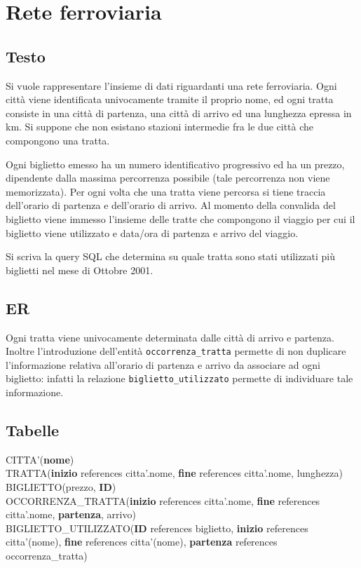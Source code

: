 \documentclass[11pt]{article}
\begin{document}
\newpage
\section{Rete ferroviaria}
\subsection{Testo}
Si vuole rappresentare l'insieme di dati riguardanti una rete ferroviaria. Ogni citt\`a
viene identificata univocamente tramite il proprio nome, ed ogni tratta consiste in una
citt\`a di partenza, una citt\`a di arrivo ed una lunghezza epressa in km. Si suppone che non
esistano stazioni intermedie fra le due citt\`a che compongono una tratta.

Ogni biglietto emesso ha un numero identificativo progressivo ed ha un prezzo, dipendente
dalla massima percorrenza possibile (tale percorrenza non viene memorizzata). Per ogni
volta che una tratta viene percorsa si tiene traccia dell'orario di partenza e dell'orario
di arrivo. Al momento
della convalida del biglietto viene immesso l'insieme delle tratte che compongono il
viaggio per cui il biglietto viene utilizzato e data/ora di partenza e arrivo del viaggio.

Si scriva la query SQL che determina su quale tratta sono stati utilizzati pi\`u biglietti
nel mese di Ottobre 2001.

\subsection{ER}
\begin{center}
\end{center}

Ogni tratta viene univocamente determinata dalle citt\`a di arrivo e partenza. Inoltre
l'introduzione dell'entit\`a \texttt{occorrenza\_tratta} permette di non duplicare
l'informazione relativa all'orario di partenza e arrivo da associare ad ogni biglietto:
infatti la relazione \texttt{biglietto\_utilizzato} permette di individuare tale
informazione.

\subsection{Tabelle}

\noindent
CITTA'(\textbf{nome})\\
TRATTA(\textbf{inizio} references citta'.nome, \textbf{fine} references citta'.nome,
lunghezza)\\
BIGLIETTO(prezzo, \textbf{ID})\\
OCCORRENZA\_TRATTA(\textbf{inizio} references citta'.nome, \textbf{fine} references
citta'.nome, \textbf{partenza}, arrivo)\\
BIGLIETTO\_UTILIZZATO(\textbf{ID} references biglietto, \textbf{inizio} references
citta'(nome), \textbf{fine} references citta'(nome), \textbf{partenza} references occorrenza\_tratta)
\end{document}
